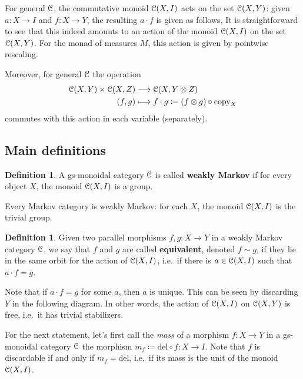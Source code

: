 \documentclass[a4paper,UKenglish,numberwithinsect,cleveref, autoref, thm-restate]{lipics-v2021}
\theoremstyle{plain} %
\theoremstyle{definition} %
\newtheorem{mydefinition}[mytheorem]{Definition}
\begin{document}
For general $\mathcal{C}$, the commutative monoid $\mathcal{C}(X,I)$ acts on the set $\mathcal{C}(X,Y)$: given $a:X\to I$ and $f:X\to Y$, the resulting $a\cdot f$ is given as follows,
It is straightforward to see that this indeed amounts to an action of the monoid $\mathcal{C}(X,I)$ on the set $\mathcal{C}(X,Y)$.
For the monad of measures $M$, this action is given by pointwise rescaling.

Moreover, for general $\mathcal{C}$ the operation
\begin{align*}
	\mathcal{C}(X,Y) \times \mathcal{C}(X,Z) & \longrightarrow \mathcal{C}(X,Y \otimes Z)		\\
	(f,g) & \longmapsto f\cdot g \coloneqq (f\otimes g)\circ\mathrm{copy}_X
\end{align*}
commutes with this action in each variable (separately). 

\subsection{Main definitions}


\begin{mydefinition}\label{defweaklymarkov}
 A gs-monoidal category $\mathcal{C}$ is called \textbf{weakly Markov} if for every object $X$, the monoid $\mathcal{C}(X,I)$ is a group. 
\end{mydefinition}

Every Markov category is weakly Markov: for each $X$, the monoid $\mathcal{C}(X,I)$ is the trivial group.

\begin{mydefinition}
 Given two parallel morphisms $f,g:X\to Y$ in a weakly Markov category $\mathcal{C}$, we say that $f$ and $g$ are called \textbf{equivalent}, denoted $f\sim g$, if they lie in the same orbit for the action of $\mathcal{C}(X,I)$, i.e.~if there is $a\in \mathcal{C}(X,I)$ such that $a\cdot f=g$.
\end{mydefinition}

Note that if $a\cdot f=g$ for some $a$, then $a$ is unique. This can be seen by discarding $Y$ in the following diagram.
In other words, the action of $\mathcal{C}(X,I)$ on $\mathcal{C}(X,Y)$ is free, i.e.~it has trivial stabilizers.

For the next statement, let's first call the \emph{mass} of a morphism $f:X\to Y$ in a gs-monoidal category $\mathcal{C}$ the morphism $m_f\coloneqq \mathrm{del}\circ f:X\to I$.
Note that $f$ is discardable if and only if $m_f=\mathrm{del}$, i.e.~if its mass is the unit of the monoid $\mathcal{C}(X,I)$.
\end{document}
